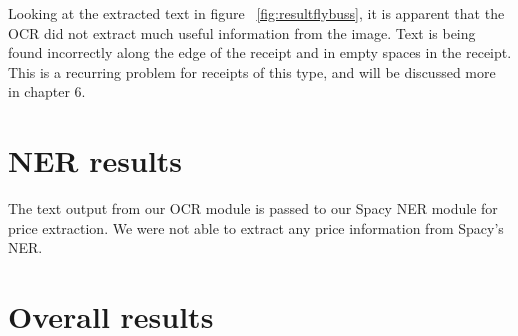 Looking at the extracted text in figure \figurename{~\ref{fig:resultflybuss}}, it is apparent that the OCR did not
extract much useful information from the image.
Text is being found incorrectly along the edge of the receipt and in empty spaces in the receipt.
This is a recurring problem for receipts of this type, and will be discussed more in chapter 6.

\section{NER results}\label{sec:ner-results}
The text output from our OCR module is passed to our Spacy NER module for price extraction.
We were not able to extract any price information from Spacy's NER.

\section{Overall results}\label{sec:overall-results}

